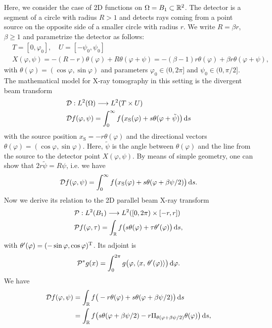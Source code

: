 \documentclass{amsart}
\renewcommand*{\phi}{\varphi}
\begin{document}
Here, we consider the case of 2D functions on $\Omega = B_1 \subset {\ensuremath{\mathbb{R}}}^2$. The detector is a segment of a circle with radius $R > 1$ and 
detects rays coming from a point source on the opposite side of a smaller circle with radius $r$. We write $R = \beta r$, $\beta \geq 1$ 
and parametrize the detector as follows:
%
\begin{align*}
 & T = [0, \phi_0],\quad U = [-\psi_0, \psi_0] \\
 & X(\phi, \psi) = -(R - r) \theta(\phi) + R \theta(\phi + \psi) = -(\beta - 1) r \theta(\phi) + \beta r \theta(\phi + \psi),
\end{align*}
%
with $\theta(\phi) = (\cos\phi, \sin\phi)$ and parameters $\phi_0 \in (0, 2\pi]$ and $\psi_0 \in (0, \pi/2]$. The mathematical model 
for X-ray tomography in this setting is the divergent beam transform
%
\begin{align}
 &\OPD: L^2(\Omega) \Lto L^2(T \times U) \notag\\
 \label{eq:fancurved:fwdproj_otherangle}
 &\OPD f(\phi, \psi) = \int_0^\infty f\big(x_{\mathrm{S}}(\phi) + s \theta(\phi + \tilde\psi)\big)\, \D s
\end{align}
%
with the source position $x_{\mathrm{S}} = -r \theta(\phi)$ and the directional vectors $\theta(\phi) = (\cos\phi, \sin\phi)$. Here, 
$\tilde\psi$ is the angle between $\theta(\phi)$ and the line from the source to the detector point $X(\phi, \psi)$. By means of simple 
geometry, one can show that $2r \tilde\psi = R\psi$, i.e. we have
%
\begin{equation}
 \label{eq:fancurved:fwdproj_realangle}
 \OPD f(\phi, \psi) = \int_0^\infty f\big(x_{\mathrm{S}}(\phi) + s \theta(\phi + \beta\psi/2)\big)\, \D s.
\end{equation} 
%
Now we derive its relation to the 2D parallel beam X-ray transform
%
\begin{align}
 &\OPP: L^2(B_1) \Lto L^2([0,2\pi) \times [-r,r]) \notag \\
 \label{eq:fancurved:xray_fwdproj}
 &\OPP f(\phi, \tau) = \int_\RR f\big(s\theta(\phi) + \tau \theta'(\phi)\big)\, \D s,
\end{align} 
%
with $\theta'(\phi) = \TRANSP{(-\sin\phi, \cos\phi)}$. Its adjoint is
%
\begin{equation}
 \label{eq:fancurved:xray_backproj}
 \DUALOPP g(x) = \int_0^{2\pi} g\big(\phi, \INNER{x}{\theta'(\phi)}\big)\, \D\phi.
\end{equation} 
%
We have
%
\begin{align*}
 \OPD f(\phi, \psi) 
 &= \int_\RR f\big(- r\theta(\phi) + s \theta(\phi + \beta\psi/2)\big)\, \D s \\
 &= \int_\RR f\big(s \theta(\phi + \beta\psi/2) - r \Pi_{\theta(\phi + \beta\psi/2)}\theta(\phi) \big)\, \D s,
\end{align*}
\end{document}
